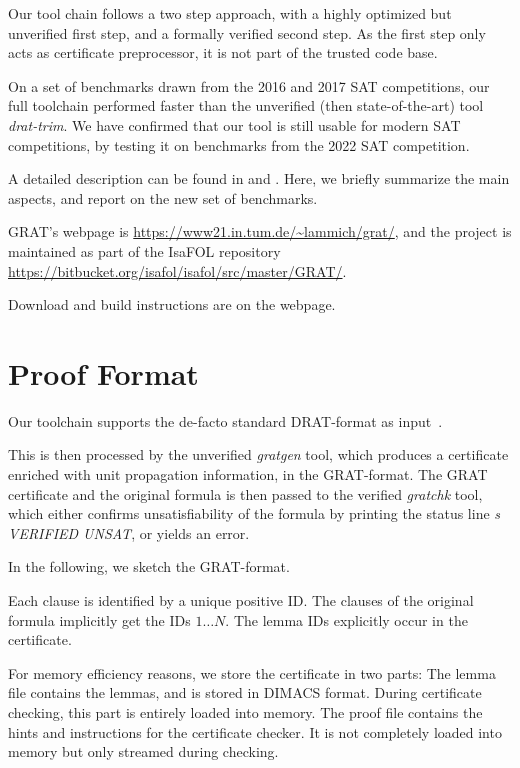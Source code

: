 \documentclass{llncs}     %
\begin{document}
Our tool chain follows a two step approach, with a highly optimized but unverified first step,
and a formally verified second step. As the first step only acts as certificate preprocessor,
it is not part of the trusted code base.

On a set of benchmarks drawn from the 2016 and 2017 SAT competitions, our full toolchain performed faster
than the unverified (then state-of-the-art) tool {\sl drat-trim}.
We have confirmed that our tool is still usable for modern SAT competitions, by testing it on benchmarks from the 2022 SAT competition.

A detailed description can be found in \cite{La17_CADE,La17_SAT} and \cite{La20}.
Here, we briefly summarize the main aspects, and report on the new set of benchmarks.

GRAT's webpage is \url{https://www21.in.tum.de/~lammich/grat/}, and the project is maintained as part of the IsaFOL repository \url{https://bitbucket.org/isafol/isafol/src/master/GRAT/}.

Download and build instructions are on the webpage.


\section{Proof Format}
Our toolchain supports the de-facto standard DRAT-format as input~\cite{WHH14}.

This is then processed by the unverified {\sl gratgen} tool, which produces a certificate enriched with unit
propagation information, in the GRAT-format. The GRAT certificate and the original formula
is then passed to the verified {\sl gratchk} tool, which either confirms unsatisfiability of the formula by printing
the status line {\sl s VERIFIED UNSAT}, or yields an error.

In the following, we sketch the GRAT-format.

Each clause is identified by a unique positive ID.
The clauses of the original formula implicitly get the IDs $1\ldots N$. The lemma IDs explicitly occur in the certificate.

For memory efficiency reasons, we store the certificate in two parts: The lemma file contains the lemmas, and is stored in DIMACS format.
During certificate checking, this part is entirely loaded into memory.
The proof file contains the hints and instructions for the certificate checker. It is not completely loaded into memory but only streamed during checking.
\end{document}
